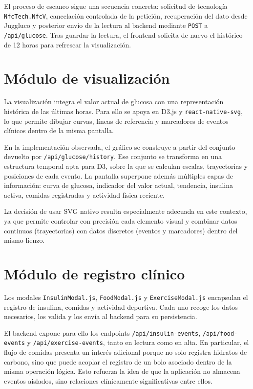 El proceso de escaneo sigue una secuencia concreta: solicitud de tecnología
\texttt{NfcTech.NfcV}, cancelación controlada de la petición, recuperación del dato desde
Juggluco y posterior envío de la lectura al backend mediante \texttt{POST} a
\texttt{/api/glucose}. Tras guardar la lectura, el frontend solicita de nuevo el histórico
de 12 horas para refrescar la visualización.

\section{Módulo de visualización}

La visualización integra el valor actual de glucosa con una representación histórica de
las últimas horas. Para ello se apoya en D3.js y \texttt{react-native-svg}, lo que
permite dibujar curvas, líneas de referencia y marcadores de eventos clínicos dentro de
la misma pantalla.

En la implementación observada, el gráfico se construye a partir del conjunto devuelto por
\texttt{/api/glucose/history}. Ese conjunto se transforma en una estructura temporal apta
para D3, sobre la que se calculan escalas, trayectorias y posiciones de cada evento. La
pantalla superpone además múltiples capas de información: curva de glucosa, indicador del
valor actual, tendencia, insulina activa, comidas registradas y actividad física reciente.

La decisión de usar SVG nativo resulta especialmente adecuada en este contexto, ya que
permite controlar con precisión cada elemento visual y combinar datos continuos
(trayectorias) con datos discretos (eventos y marcadores) dentro del mismo lienzo.

\section{Módulo de registro clínico}

Los modales \texttt{InsulinModal.js}, \texttt{FoodModal.js} y
\texttt{ExerciseModal.js} encapsulan el registro de insulina, comidas y actividad
deportiva. Cada uno recoge los datos necesarios, los valida y los envía al backend para
su persistencia.

El backend expone para ello los endpoints \texttt{/api/insulin-events},
\texttt{/api/food-events} y \texttt{/api/exercise-events}, tanto en lectura como en alta.
En particular, el flujo de comidas presenta un interés adicional porque no solo registra
hidratos de carbono, sino que puede acoplar el registro de un bolo asociado dentro de la
misma operación lógica. Esto refuerza la idea de que la aplicación no almacena eventos
aislados, sino relaciones clínicamente significativas entre ellos.


